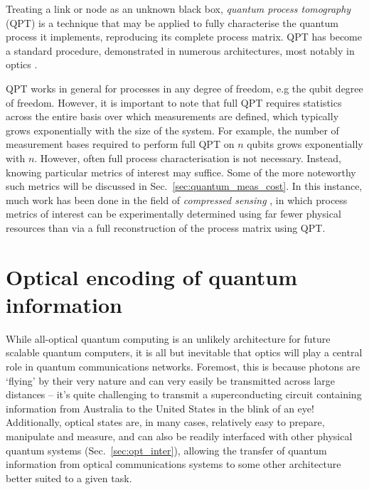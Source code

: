 \documentclass[aps,rmp,twocolumn,amsmath,amssymb,nofootinbib,superscriptaddress]{revtex4}
\begin{document}
Treating a link or node as an unknown black box, \emph{quantum process tomography} (QPT) \cite{bib:ChuangNielsen97, ???} is a technique that may be applied to fully characterise the quantum process it implements, reproducing its complete process matrix. QPT has become a standard procedure, demonstrated in numerous architectures, most notably in optics \cite{bib:OBrien04, bib:RohdeGateChar05}.

QPT works in general for processes in any degree of freedom, e.g the qubit degree of freedom. However, it is important to note that full QPT requires statistics across the entire basis over which measurements are defined, which typically grows exponentially with the size of the system. For example, the number of measurement bases required to perform full QPT on $n$ qubits grows exponentially with $n$. However, often full process characterisation is not necessary. Instead, knowing particular metrics of interest may suffice. Some of the more noteworthy such metrics will be discussed in Sec.~\ref{sec:quantum_meas_cost}. In this instance, much work has been done in the field of \emph{compressed sensing} \cite{??? compressed_sensing}, in which process metrics of interest can be experimentally determined using far fewer physical resources than via a full reconstruction of the process matrix using QPT.

%
%

\section{Optical encoding of quantum information} \label{sec:opt_enc_of_qi}

While all-optical quantum computing is an unlikely architecture for future scalable quantum computers, it is all but inevitable that optics will play a central role in quantum communications networks. Foremost, this is because photons are `flying' by their very nature and can very easily be transmitted across large distances -- it's quite challenging to transmit a superconducting circuit containing information from Australia to the United States in the blink of an eye! Additionally, optical states are, in many cases, relatively easy to prepare, manipulate and measure, and can also be readily interfaced with other physical quantum systems (Sec.~\ref{sec:opt_inter}), allowing the transfer of quantum information from optical communications systems to some other architecture better suited to a given task.
\end{document}
